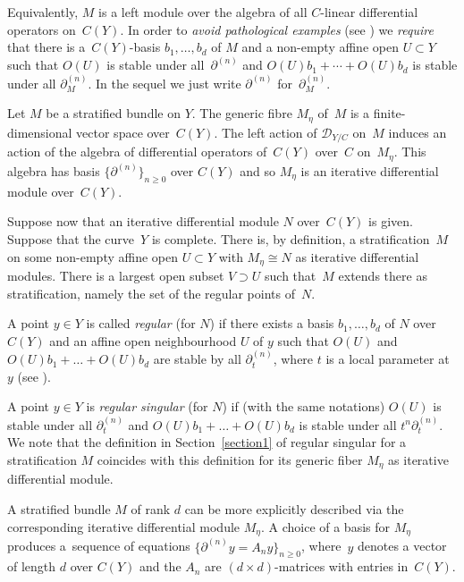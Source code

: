 \documentclass[pdftex]{sigma}
\numberwithin{equation}{section}
\begin{document}
Equivalently, $M$ is a left module over the algebra of all $C$-linear differential operators on~$C(Y)$. In order to {\it avoid pathological examples} (see \cite[Sections~4.2 and~7]{Ma-vdP1}) we {\it require} that there is a~$C(Y)$-basis $b_1,\dots ,b_d$ of $M$ and a non-empty affine open $U\subset Y$ such that $O(U)$ is stable under all~$\partial^{(n)}$ and $O(U)b_1+\cdots +O(U)b_d$ is stable under all $\partial_M^{(n)}$. In the sequel we just write $\partial^{(n)}$ for~$\partial^{(n)}_M$.

Let $M$ be a stratified bundle on $Y$. The generic fibre $M_\eta$ of~$M$ is a finite-dimensional vector space over~$C(Y)$. The left action of $\mathcal{D}_{Y/C}$ on~$M$ induces an action of the algebra of differential operators of~$C(Y)$ over~$C$ on~$M_\eta$. This algebra has basis $\big\{\partial ^{(n)}\big\}_{n\geq 0}$ over $C(Y)$ and so $M_\eta$ is an iterative differential module over~$C(Y)$.

Suppose now that an iterative differential module $N$ over~$C(Y)$ is given. Suppose that the curve~$Y$ is complete. There is, by definition, a stratification~$M$ on some non-empty affine open $U\subset Y$ with $M_\eta \cong N$ as iterative differential modules. There is a largest open subset $V\supset U$ such that~$M$ extends there as stratification, namely the set of the regular points of~$N$.

A point $y\in Y$ is called {\it regular} (for $N$) if there exists a basis $b_1,\dots ,b_d$ of $N$ over $C(Y)$ and an affine open neighbourhood $U$ of $y$ such that $O(U)$ and $O(U)b_1+\dots +O(U)b_d$ are stable by all $\partial ^{(n)}_t$, where $t$ is a local parameter at $y$ (see \cite[Section~7 and Corollary~6.2(3)]{Ma-vdP1}).

A point $y\in Y$ is {\it regular singular} (for $N$) if (with the same notations) $O(U)$ is stable under all $\partial^{(n)}_t$ and $O(U)b_1+\dots +O(U)b_d$ is stable under all $t^n\partial_t^{(n)}$. We note that the definition in Section~\ref{section1} of regular singular for a stratification $M$ coincides with this definition for its generic fiber $M_\eta$ as iterative differential module.

A stratified bundle $M$ of rank $d$ can be more explicitly described via the corresponding iterative differential module $M_\eta$. A choice of a basis for $M_\eta$ produces a~sequence of equations $\big\{\partial ^{(n)}y=A_ny\big\}_{n\geq 0}$, where~$y$ denotes a vector of length $d$ over $C(Y)$ and the $A_n$ are $(d\times d)$-matrices with entries in~$C(Y)$.
\end{document}
